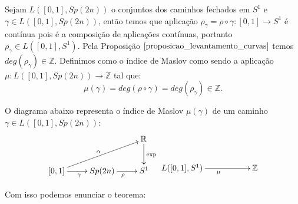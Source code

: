 \documentclass[12pt]{book}
\newcommand{\gruposimpletico}[1]{Sp(#1)}
\newcommand{\real}[1]{\mathbb{R}^{#1}}
\newcommand{\caminhosfechadoscirculo}[2]{L([#1,#2], S^{1})}
\newcommand{\caminhosfechadosSp}[2]{L([#1,#2], \gruposimpletico{2n})}
\begin{document}
	Sejam $\caminhosfechadosSp{0}{1}$ o conjuntos dos caminhos fechados em $S^{1}$ e $\gamma \in \caminhosfechadosSp{0}{1}$, então temos que aplicação $\rho_{\gamma}=\rho\circ \gamma:[0,1] \to S^{1}$ é contínua pois é a composição de aplicações contínuas, portanto $\rho_{\gamma} \in \caminhosfechadoscirculo{0}{1}$. Pela Proposição $\ref{proposicao_levantamento_curvas}$ temos $deg(\rho_{\gamma}) \in \mathbb{Z}$. Definimos como o índice de Maslov como sendo a aplicação $\mu:\caminhosfechadosSp{0}{1} \to \mathbb{Z}$ tal que:
	$$
	\mu(\gamma) = deg(\rho \circ \gamma) = deg(\rho_{\gamma}) \in \mathbb{Z}.
	$$

	O diagrama abaixo representa o índice de Maslov $\mu(\gamma)$ de um caminho $\gamma \in \caminhosfechadosSp{0}{1}$:
	$$
	\xymatrix{
		& & \real{}\ar[d]\ar[d]^{\text{exp}}
		\\
		[0,1 ]\ar[urr]^{\alpha} \ar[r]_{\gamma} & Sp(2n) \ar[r]_{\rho} & S^{1}
	}
	\xymatrix{
		& &
		\\
		\caminhosfechadoscirculo{0}{1}\ar[rr]_{\mu} & & \mathbb{Z} 
	}
	$$

	Com isso podemos enunciar o teorema:
		
\end{document}
